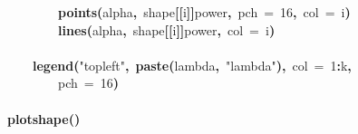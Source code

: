 \documentclass{elsarticle}
\makeatletter
\newcommand{\hlnumber}[1]{\textcolor[rgb]{0,0,0}{#1}}%
\newcommand{\hlfunctioncall}[1]{\textcolor[rgb]{.5,0,.33}{\textbf{#1}}}%
\newcommand{\hlstring}[1]{\textcolor[rgb]{.6,.6,1}{#1}}%
\newcommand{\hlkeyword}[1]{\textbf{#1}}%
\newcommand{\hlargument}[1]{\textcolor[rgb]{.69,.25,.02}{#1}}%
\newcommand{\hlsymbol}[1]{#1}%
\newcommand{\hlstd}[1]{\textcolor[rgb]{0,0,0}{#1}}%
\newenvironment{kframe}{%
 \def\FrameCommand##1{\hskip\@totalleftmargin \hskip-\fboxsep
 \colorbox{shadecolor}{##1}\hskip-\fboxsep
     \hskip-\linewidth \hskip-\@totalleftmargin \hskip\columnwidth}%
 \MakeFramed {\advance\hsize-\width
   \@totalleftmargin\z@ \linewidth\hsize
   \@setminipage}}%
 {\par\unskip\endMakeFramed}
\newenvironment{knitrout}{}{} %
\makeatother
\begin{document}
\begin{figure}
\begin{center}
\begin{knitrout}
{\begin{kframe}
\begin{flushleft}
\hlstd{}{\ }{\ }{\ }{\ }{\ }{\ }{\ }{\ }\hlfunctioncall{points}\hlkeyword{(}\hlsymbol{alpha}\hlkeyword{,}{\ }\hlsymbol{shape}\hlkeyword{[[}\hlsymbol{i}\hlkeyword{]}\hlkeyword{]}\hlkeyword{\usebox{\hlnormalsizeboxdollar}}\hlsymbol{power}\hlkeyword{,}{\ }\hlargument{pch}{\ }\hlargument{=}{\ }\hlnumber{16}\hlkeyword{,}{\ }\hlargument{col}{\ }\hlargument{=}{\ }\hlsymbol{i}\hlkeyword{)}\hspace*{\fill}\\
\hlstd{}{\ }{\ }{\ }{\ }{\ }{\ }{\ }{\ }\hlfunctioncall{lines}\hlkeyword{(}\hlsymbol{alpha}\hlkeyword{,}{\ }\hlsymbol{shape}\hlkeyword{[[}\hlsymbol{i}\hlkeyword{]}\hlkeyword{]}\hlkeyword{\usebox{\hlnormalsizeboxdollar}}\hlsymbol{power}\hlkeyword{,}{\ }\hlargument{col}{\ }\hlargument{=}{\ }\hlsymbol{i}\hlkeyword{)}\hspace*{\fill}\\
\hlstd{}{\ }{\ }{\ }{\ }\hlkeyword{\usebox{\hlnormalsizeboxclosebrace}}\hspace*{\fill}\\
\hlstd{}{\ }{\ }{\ }{\ }\hlfunctioncall{legend}\hlkeyword{(}\hlstring{"{}topleft"{}}\hlkeyword{,}{\ }\hlfunctioncall{paste}\hlkeyword{(}\hlsymbol{lambda}\hlkeyword{,}{\ }\hlstring{"{}lambda"{}}\hlkeyword{)}\hlkeyword{,}{\ }\hlargument{col}{\ }\hlargument{=}{\ }\hlnumber{1}\hlkeyword{:}\hlsymbol{k}\hlkeyword{,}\hspace*{\fill}\\
\hlstd{}{\ }{\ }{\ }{\ }{\ }{\ }{\ }{\ }\hlargument{pch}{\ }\hlargument{=}{\ }\hlnumber{16}\hlkeyword{)}\hspace*{\fill}\\
\hlstd{}\hlkeyword{\usebox{\hlnormalsizeboxclosebrace}}\hspace*{\fill}\\
\hlstd{}\hlfunctioncall{plot\usebox{\hlnormalsizeboxunderscore}shape}\hlkeyword{(}\hlkeyword{)}\mbox{}
\normalfont
\end{flushleft}



\end{kframe}}
\end{knitrout}
\end{center}
\end{figure}
\end{document}
